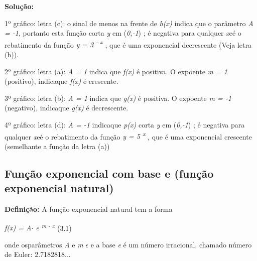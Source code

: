 \begin{texemplo}
\textbf{Solução: }

1º gráfico: letra (c): o sinal de menos na frente de \textit{h(x)} indica que o parâmetro \textit{A = -1}, portanto esta função corta \textit{y} em (\textit{0,-1}) ; é negativa para qualquer \textit{x}eé o rebatimento da função   \textit{y = 3\textsuperscript{ - x}} , que é uma exponencial decrescente (Veja letra (b)).

2º gráfico: letra (a): \textit{A = 1} indica que \textit{f(x)} é positiva. O expoente \textit{m = 1 }(positivo),  indicaque  \textit{f(x)} é crescente. 

3º gráfico: letra (b): \textit{A = 1} indica que \textit{g(x)} é positiva. O expoente \textit{m = -1 }(negativo),  indicaque  \textit{g(x)} é decrescente. 

4º gráfico: letra (d): \textit{A = -1 } indicaque  \textit{p(x)} corta \textit{y} em (\textit{0,-1}) ; é negativa para qualquer \textit{x}eé o rebatimento da função   \textit{y = 5\textsuperscript{ x}} , que é uma exponencial crescente (semelhante a função da letra (a)) \qedsymbol{}
\end{texemplo}

\subsection{Função exponencial com base e (função exponencial natural)}

\begin{caixa}
\textbf{Definição:} A função exponencial natural tem a forma

  \textit{f(x) = A$ \cdot $  e \textsuperscript{m $ \cdot $  x}} (3.1)

onde osparâmetros  \textit{A }e \textit{m} $ \epsilon $ e a base \textit{e} é um número irracional, chamado  número de Euler: 2.7182818...
\end{caixa}

